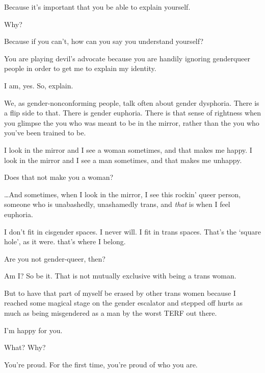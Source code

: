 \begin{paracol}{2}
\begin{leftcolumn}
\begin{ally}
Because it's important that you be able to explain yourself.
\end{ally}
Why?

\begin{ally}
Because if you can't, how can you say you understand yourself?
\end{ally}
\newpage

\noindent You are playing devil's advocate because you are handily ignoring genderqueer people in order to get me to explain my identity.

\begin{ally}
I am, yes. So, explain.
\end{ally}
We, as gender-nonconforming people, talk often about gender dysphoria. There is a flip side to that. There is gender euphoria. There is that sense of rightness when you glimpse the you who was meant to be in the mirror, rather than the you who you've been trained to be.

I look in the mirror and I see a woman sometimes, and that makes me happy. I look in the mirror and I see a man sometimes, and that makes me unhappy.

\begin{ally}
Does that not make you a woman?
\end{ally}
\ldots{}And sometimes, when I look in the mirror, I see this rockin' queer person, someone who is unabashedly, unashamedly trans, and \emph{that} is when I feel euphoria.

I don't fit in cisgender spaces. I never will. I fit in trans spaces. That's the `square hole', as it were. that's where I belong.

\begin{ally}
Are you not gender-queer, then?
\end{ally}
Am I? So be it. That is not mutually exclusive with being a trans woman.

But to have that part of myself be erased by other trans women because I reached some magical stage on the gender escalator and stepped off hurts as much as being misgendered as a man by the worst TERF out there.
\newpage
\null
\newpage
\null
\vfill
\begin{ally}
I'm happy for you.
\end{ally}
What? Why?

\begin{ally}
You're proud. For the first time, you're proud of who you are.
\end{ally}
\vfill
\newpage
\end{leftcolumn}
\end{paracol}
